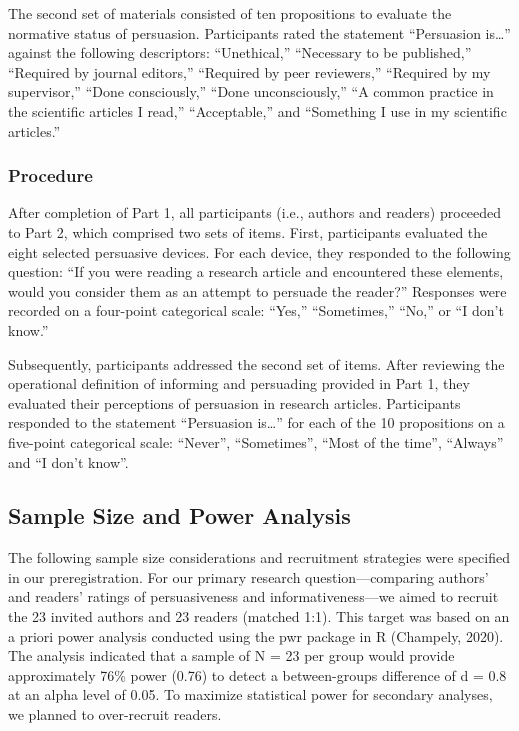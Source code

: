 \documentclass[authordate, meta]{jote-new-article}
\begin{document}
	The second set of materials consisted of ten propositions to evaluate the normative status of persuasion. Participants rated the statement “Persuasion is…” against the following descriptors: “Unethical,” “Necessary to be published,” “Required by journal editors,” “Required by peer reviewers,” “Required by my supervisor,” “Done consciously,” “Done unconsciously,” “A common practice in the scientific articles I read,” “Acceptable,” and “Something I use in my scientific articles.”



	\subsubsection{Procedure }



	After completion of Part 1, all participants (i.e., authors and readers) proceeded to Part 2, which comprised two sets of items. First, participants evaluated the eight selected persuasive devices. For each device, they responded to the following question: “If you were reading a research article and encountered these elements, would you consider them as an attempt to persuade the reader?” Responses were recorded on a four-point categorical scale: “Yes,” “Sometimes,” “No,” or “I don't know.”



	Subsequently, participants addressed the second set of items. After reviewing the operational definition of informing and persuading provided in Part 1, they evaluated their perceptions of persuasion in research articles. Participants responded to the statement “Persuasion is…” for each of the 10 propositions on a five-point categorical scale: “Never”, “Sometimes”, “Most of the time”, “Always” and “I don't know”.



	\subsection{Sample Size and Power Analysis}



	The following sample size considerations and recruitment strategies were specified in our preregistration. For our primary research question—comparing authors' and readers' ratings of persuasiveness and informativeness—we aimed to recruit the 23 invited authors and 23 readers (matched 1:1). This target was based on an a priori power analysis conducted using the pwr package in R (Champely, 2020). The analysis indicated that a sample of N = 23 per group would provide approximately 76\% power (0.76) to detect a between-groups difference of d = 0.8 at an alpha level of 0.05. To maximize statistical power for secondary analyses, we planned to over-recruit readers.
\end{document}
